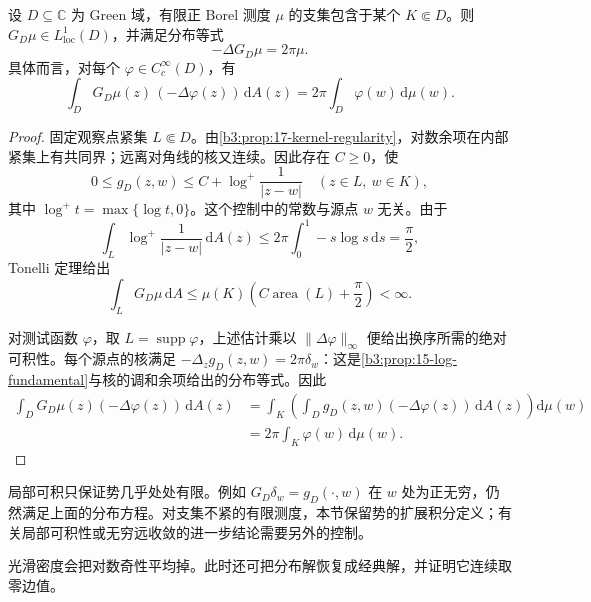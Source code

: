 \begin{proposition}\label{b3:prop:17-green-potential-distribution}
设 \(D\subseteq\mathbb C\) 为 Green 域，有限正 Borel 测度 \(\mu\) 的支集包含于某个 \(K\Subset D\)。则 \(G_D\mu\in L^1_{\mathrm{loc}}(D)\)，并满足分布等式
\begin{equation}\label{b3:eq:17-green-source}
 -\Delta G_D\mu=2\pi\mu.
\end{equation}
具体而言，对每个 \(\varphi\in C_c^\infty(D)\)，有
\[
 \int_DG_D\mu(z)\,(-\Delta\varphi(z))\,\mathrm dA(z)
 =2\pi\int_D\varphi(w)\,\mathrm d\mu(w).
\]
\end{proposition}
\begin{proof}
固定观察点紧集 \(L\Subset D\)。由\cref{b3:prop:17-kernel-regularity}，对数余项在内部紧集上有共同界；远离对角线的核又连续。因此存在 \(C\ge0\)，使
\[
 0\le g_D(z,w)\le C+\log^+\frac1{|z-w|}
 \quad(z\in L,\ w\in K),
\]
其中 \(\log^+t=\max\{\log t,0\}\)。这个控制中的常数与源点 \(w\) 无关。由于
\[
 \int_L\log^+\frac1{|z-w|}\,\mathrm dA(z)
 \le2\pi\int_0^1-s\log s\,\mathrm ds=\frac\pi2,
\]
Tonelli 定理给出
\[
 \int_LG_D\mu\,\mathrm dA
 \le\mu(K)\left(C\operatorname{area}(L)+\frac\pi2\right)<\infty.
\]

对测试函数 \(\varphi\)，取 \(L=\operatorname{supp}\varphi\)，上述估计乘以 \(\|\Delta\varphi\|_\infty\) 便给出换序所需的绝对可积性。每个源点的核满足 \(-\Delta_zg_D(z,w)=2\pi\delta_w\)：这是\cref{b3:prop:15-log-fundamental}与核的调和余项给出的分布等式。因此
\[
 \begin{aligned}
 \int_DG_D\mu(z)(-\Delta\varphi(z))\,\mathrm dA(z)
 &=\int_K\left(\int_Dg_D(z,w)(-\Delta\varphi(z))\,\mathrm dA(z)\right)\mathrm d\mu(w)\\
 &=2\pi\int_K\varphi(w)\,\mathrm d\mu(w).
 \end{aligned}
\]
\end{proof}

局部可积只保证势几乎处处有限。例如 \(G_D\delta_w=g_D(\cdot,w)\) 在 \(w\) 处为正无穷，仍然满足上面的分布方程。对支集不紧的有限测度，本节保留势的扩展积分定义；有关局部可积性或无穷远收敛的进一步结论需要另外的控制。

\ProseParagraphBreak

光滑密度会把对数奇性平均掉。此时还可把分布解恢复成经典解，并证明它连续取零边值。

